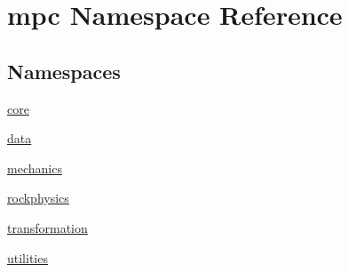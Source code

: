 \hypertarget{namespacempc}{}\section{mpc Namespace Reference}
\label{namespacempc}
\subsection*{Namespaces}
\begin{DoxyCompactItemize}
\item 
 \mbox{\hyperlink{namespacempc_1_1core}{core}}
\item 
 \mbox{\hyperlink{namespacempc_1_1data}{data}}
\item 
 \mbox{\hyperlink{namespacempc_1_1mechanics}{mechanics}}
\item 
 \mbox{\hyperlink{namespacempc_1_1rockphysics}{rockphysics}}
\item 
 \mbox{\hyperlink{namespacempc_1_1transformation}{transformation}}
\item 
 \mbox{\hyperlink{namespacempc_1_1utilities}{utilities}}
\end{DoxyCompactItemize}
